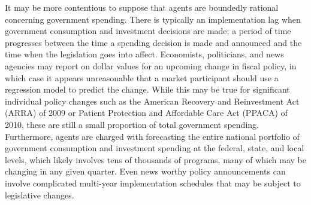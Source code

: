 \documentclass[12pt]{article}
\begin{document}
It may be more contentious to suppose that agents are boundedly rational concerning government spending. There is typically an implementation lag when government consumption and investment decisions are made; a period of time progresses between the time a spending decision is made and announced and the time when the legislation goes into affect.  Economists, politicians, and news agencies may report on dollar values for an upcoming change in fiscal policy, in which case it appears unreasonable that a market participant should use a regression model to predict the change.  While this may be true for significant individual policy changes such as the American Recovery and Reinvestment Act (ARRA) of 2009 or Patient Protection and Affordable Care Act (PPACA) of 2010, these are still a small proportion of total government spending.  Furthermore, agents are charged with forecasting the entire national portfolio of government consumption and investment spending at the federal, state, and local levels, which likely involves tens of thousands of programs, many of which may be changing in any given quarter.  Even news worthy policy announcements can involve complicated multi-year implementation schedules that may be subject to legislative changes.
\end{document}
